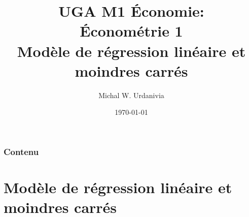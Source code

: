 
 

\title[Regression linéaire]{UGA M1 \'Economie:\\ \'Econométrie 1\\ \textbf{Modèle de r\'egression linéaire et moindres carrés}}
\date{\today}
\author{Michal W. Urdanivia\inst{*}}




\begin{frame}
\titlepage
\end{frame}

\begin{frame}
\frametitle{Contenu}
\end{frame}

\section{Modèle de régression linéaire et moindres carrés}
\frame{\sectionpage}

